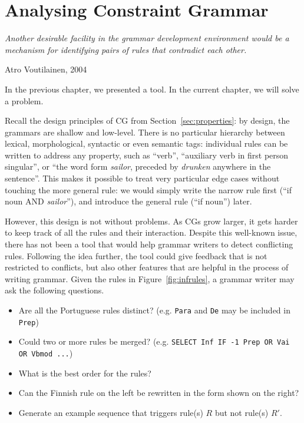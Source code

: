 \def\newcite#1{\citet{#1}}

\def\noun{\textsc{N}}
\def\verb{\textsc{V}}
\def\sg{\textsc{Sg}}
\def\pl{\textsc{Pl}}
\def\detdef{\textsc{DetDef}}


\chapter{Analysing Constraint Grammar}
\label{chapterCGana}

\epigraph{\it Another desirable facility in the grammar development
  environment would be a mechanism for identifying pairs of rules that
  contradict each other.}{Atro Voutilainen, 2004}

\noindent In the previous chapter, we presented a tool.
In the current chapter, we will solve a problem.


Recall the design principles of CG from Section~\ref{sec:properties}:
by design, the grammars are shallow and low-level.
There is no particular hierarchy between lexical, morphological,
syntactic or even semantic tags: individual rules can be written to address any
property, such as ``verb'', ``auxiliary verb in first person singular'',
or ``the word form \emph{sailor}, preceded by \emph{drunken} anywhere in the
sentence''. This makes it possible to treat very particular edge
cases without touching the more general rule: we would simply write
the narrow rule first (``if noun AND \emph{sailor}''), and introduce
the general rule (``if noun'') later.


However, this design is not without problems. As CGs grow larger, it
gets harder to keep track of all the rules and their interaction.
Despite this well-known issue, there has not been a tool that would help
grammar writers to detect conflicting rules.
Following the idea further, the tool could give feedback that is not
restricted to conflicts, but also other features that are helpful
in the process of writing grammar.
Given the rules in Figure~\ref{fig:infrules}, a grammar writer may
ask the following questions.



\begin{itemize}
\item Are all the Portuguese rules distinct? (e.g. \texttt{Para} and \texttt{De} may be included in \texttt{Prep})
\item Could two or more rules be merged? (e.g. \texttt{SELECT Inf IF -1 Prep OR Vai OR Vbmod ...})
\item What is the best order for the rules?
\item Can the Finnish rule on the left be rewritten in the form shown on the right?
\item Generate an example sequence that triggers rule(s) $R$ but not rule(s) $R'$.
\end{itemize}

